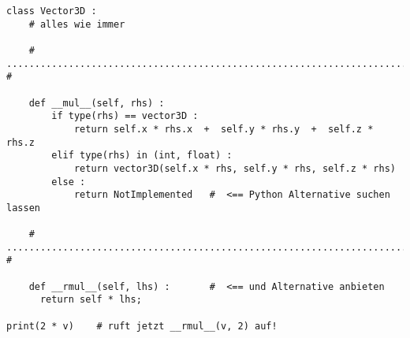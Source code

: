 
\begin{frame}[fragile]
%
\begin{codebox}
\begin{verbatim}
class Vector3D :
    # alles wie immer
    
    # ........................................................................ #
    
    def __mul__(self, rhs) :
        if type(rhs) == vector3D :
            return self.x * rhs.x  +  self.y * rhs.y  +  self.z * rhs.z
        elif type(rhs) in (int, float) :
            return vector3D(self.x * rhs, self.y * rhs, self.z * rhs)
        else :
            return NotImplemented   #  <== Python Alternative suchen lassen
    
    # ........................................................................ #
    
    def __rmul__(self, lhs) :       #  <== und Alternative anbieten
      return self * lhs;

print(2 * v)    # ruft jetzt __rmul__(v, 2) auf!
\end{verbatim}
\end{codebox}
%
\end{frame}


